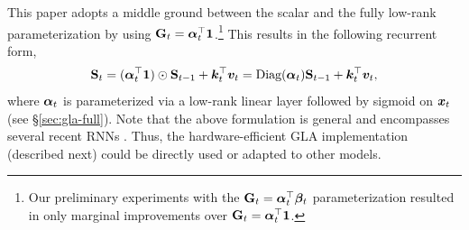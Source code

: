  
 This paper adopts a middle ground between the scalar and the fully low-rank parameterization by using ${\mathbf{G}}_{t} = {\bm{\alpha}}_t ^\top \mathbf{1}$.\footnote{Our preliminary experiments with the ${\mathbf{G}}_t = {\bm{\alpha}}_t^\top {\bm{\beta}}_t$ parameterization resulted in only marginal improvements over ${\mathbf{G}}_{t} = {\bm{\alpha}}_t ^\top \mathbf{1}$.}
This results in the following recurrent form,
%
\begin{align}
{\mathbf{S}}_t =  ({\bm{\alpha}}_t^{\top} \mathbf{1}) \odot {\mathbf{S}}_{t-1} + {\bm{k}}_t^{\top} {\bm{v}}_t = \text{Diag}({\bm{\alpha}}_t)  {\mathbf{S}}_{t-1} + {\bm{k}}_t^{\top} {\bm{v}}_t, 
\label{eq:gla-simple}
\end{align}
%
where ${\bm{\alpha}}_t$ is parameterized via a low-rank linear layer followed by sigmoid on ${\bm{x}}_t$ (see \S\ref{sec:gla-full}). Note that the above formulation 
 is general and  encompasses several recent RNNs \cite{gatedloop, qin2024hgrn2, peng2024eagle}. Thus, the hardware-efficient GLA implementation (described next) could be directly used or adapted to other models. 

%

%





\vspace{-2mm}

